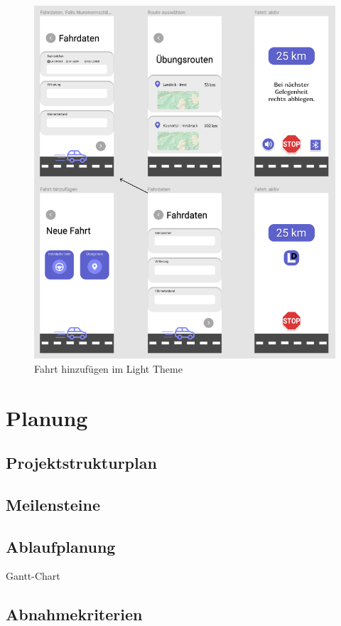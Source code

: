 \begin{figure}[H]
	\centering
	\includegraphics[width=15cm]{figures/mockup3.png}
	\caption{Fahrt hinzufügen im Light Theme}
	\label{fig:mockup3}
\end{figure}

\section{Planung}
\subsection{Projektstrukturplan}
\subsection{Meilensteine}
\subsection{Ablaufplanung}
Gantt-Chart
\subsection{Abnahmekriterien}
